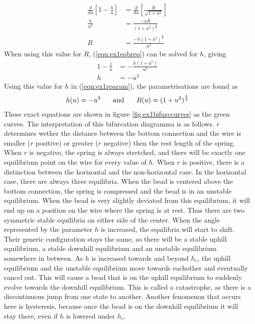 \begin{align}
\frac{d}{du}\left[1-\frac{h}{u}\right]&=\frac{d}{du}\left[\frac{R}{\sqrt{1+u^2}}\right]\\
\frac{h}{u^2}&=\frac{-uR}{(1+u^2)^{\frac{3}{2}}}\\
R&=\frac{-h(1+u^2)^{\frac{3}{2}}}{u^3}\label{eqn:ex1rparam}
\end{align}
When using this value for $R$, (\ref{eqn:ex1eqbreq}) can be solved for $h$, giving
\begin{align}
1-\frac{1}{u}&=-\frac{h(1+u^2)}{u^3}\\
h&=-u^3
\end{align}
Using this value for $h$ in (\ref{eqn:ex1rparam}), the parametrisations are found as
\begin{equation}
h(u)=-u^3\mbox{\hspace{18pt}and\hspace{18pt}}R(u)=(1+u^2)^{\frac{3}{2}}
\end{equation}
These exact equations are shown in figure \ref{fig:ex1bifurccurves} as the green curves.
\newline
\newline
The interpretation of this bifurcation diagramma is as follows. $r$ determines wether the distance between the bottom connection and the wire is smaller ($r$ positive) or greater ($r$ negative) then the rest length of the spring.
\newline
\newline
When $r$ is negative, the spring is always stretched, and there will be exactly one equilibrium point on the wire for every value of $h$. 
\newline
\newline
When $r$ is positive, there is a distinction between the horizontal and the non-horizontal case. In the horizontal case, there are always three equilibria. When the bead is centered above the bottom connection, the spring is compressed and the bead is in an unstable equilibrium. When the bead is very slightly deviated from this equilibrium, it will end up on a position on the wire where the spring is at rest. Thus there are two symmetric stable equilibria on either side of the center.
\newline
\newline
When the angle represented by the parameter $h$ is increased, the equilibria will start to shift. Their generic configuration stays the same, so there will be a stable uphill equilibrium, a stable downhill equilibrium and an unstable equilibrium somewhere in between. As $h$ is increased towards and beyond $h_c$, the uphill equilibrium and the unstable equilibrium move towards eachother and eventually cancel out. This will cause a bead that is on the uphill equilibrium to suddenly evolve towards the downhill equilibrium. This is called a catastrophe, as there is a discontinuous jump from one state to another. Another fenomenon that occurs here is hysteresis, because once the bead is on the downhill equilibrium it will stay there, even if $h$ is lowered under $h_c$. 

